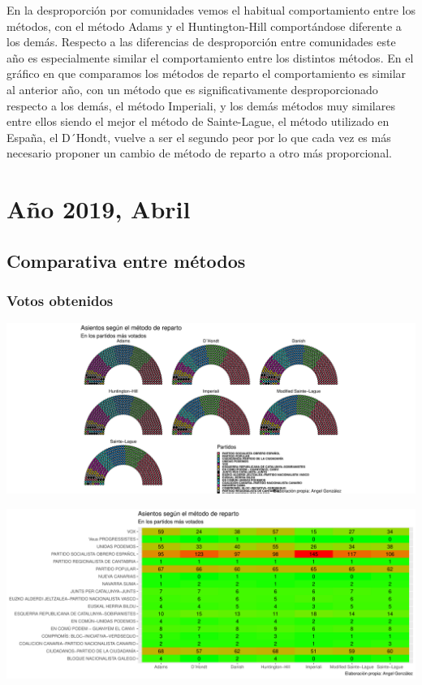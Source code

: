 \documentclass[12pt,a4paper,]{book}
\numberwithin{dummy}{section}
\theoremstyle{ocrenumbox}
\theoremstyle{blacknumex}
\theoremstyle{blacknumbox}
\theoremstyle{ocrenum}
\theoremstyle{ocrenum}
\begin{document}
En la desproporción por comunidades vemos el habitual comportamiento
entre los métodos, con el método Adams y el Huntington-Hill
comportándose diferente a los demás. Respecto a las diferencias de
desproporción entre comunidades este año es especialmente similar el
comportamiento entre los distintos métodos. En el gráfico en que
comparamos los métodos de reparto el comportamiento es similar al
anterior año, con un método que es significativamente desproporcionado
respecto a los demás, el método Imperiali, y los demás métodos muy
similares entre ellos siendo el mejor el método de Sainte-Lague, el
método utilizado en España, el D´Hondt, vuelve a ser el segundo peor por
lo que cada vez es más necesario proponer un cambio de método de reparto
a otro más proporcional.

\hypertarget{auxf1o-2019-abril}{%
\section{Año 2019, Abril}\label{auxf1o-2019-abril}}

\hypertarget{comparativa-entre-muxe9todos-13}{%
\subsection{Comparativa entre
métodos}\label{comparativa-entre-muxe9todos-13}}

\hypertarget{votos-obtenidos-13}{%
\subsubsection{Votos obtenidos}\label{votos-obtenidos-13}}

\begin{center}\includegraphics[width=0.95\linewidth]{figurasR/unnamed-chunk-128-1} \end{center}

\begin{center}\includegraphics[width=0.95\linewidth]{figurasR/unnamed-chunk-128-2} \end{center}
\end{document}
